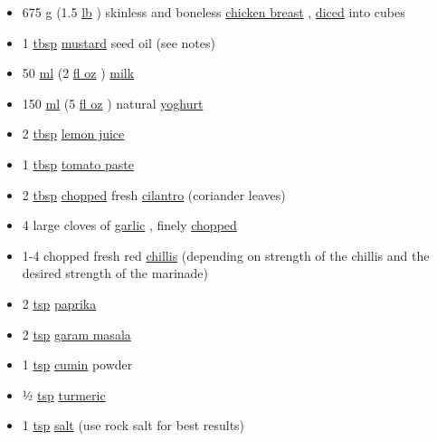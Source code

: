 \documentclass[11pt,a4paper]{article}
\begin{document}
\begin{itemize}
\item 675 \href{https://en.wikibooks.org/wiki/Cookbook:G}{g} (1.5 \href{https://en.wikibooks.org/wiki/Cookbook:Pound}{lb} ) skinless and boneless \href{https://en.wikibooks.org/wiki/Cookbook:Chicken\#Breast}{chicken breast} , \href{https://en.wikibooks.org/wiki/Cookbook:Dice}{diced} into cubes
\item 1 \href{https://en.wikibooks.org/wiki/Cookbook:Tablespoon}{tbsp} \href{https://en.wikibooks.org/wiki/Cookbook:Mustard}{mustard} seed oil (see notes)
\item 50 \href{https://en.wikibooks.org/wiki/Cookbook:ML}{ml} (2 \href{https://en.wikibooks.org/wiki/Cookbook:Fluid\_Ounce}{fl oz} ) \href{https://en.wikibooks.org/wiki/Cookbook:Milk}{milk}
\item 150 \href{https://en.wikibooks.org/wiki/Cookbook:ML}{ml} (5 \href{https://en.wikibooks.org/wiki/Cookbook:Fluid\_Ounce}{fl oz} ) natural \href{https://en.wikibooks.org/wiki/Cookbook:Yogurt}{yoghurt}
\item 2 \href{https://en.wikibooks.org/wiki/Cookbook:Tablespoon}{tbsp} \href{https://en.wikibooks.org/wiki/Cookbook:Lemon\_Juice}{lemon juice}
\item 1 \href{https://en.wikibooks.org/wiki/Cookbook:Tablespoon}{tbsp} \href{https://en.wikibooks.org/wiki/Cookbook:Tomato\_Paste}{tomato paste}
\item 2 \href{https://en.wikibooks.org/wiki/Cookbook:Tablespoon}{tbsp} \href{https://en.wikibooks.org/wiki/Cookbook:Chopping}{chopped} fresh \href{https://en.wikibooks.org/wiki/Cookbook:Cilantro}{cilantro} (coriander leaves)
\item 4 large cloves of \href{https://en.wikibooks.org/wiki/Cookbook:Garlic}{garlic} , finely \href{https://en.wikibooks.org/wiki/Cookbook:Chop}{chopped}
\item 1-4 chopped fresh red \href{https://en.wikibooks.org/wiki/Cookbook:Chili\_Pepper}{chillis} (depending on strength of the chillis and the desired strength of the marinade)
\item 2 \href{https://en.wikibooks.org/wiki/Cookbook:Teaspoon}{tsp} \href{https://en.wikibooks.org/wiki/Cookbook:Paprika}{paprika}
\item 2 \href{https://en.wikibooks.org/wiki/Cookbook:Teaspoon}{tsp} \href{https://en.wikibooks.org/wiki/Cookbook:Garam\_Masala}{garam masala}
\item 1 \href{https://en.wikibooks.org/wiki/Cookbook:Teaspoon}{tsp} \href{https://en.wikibooks.org/wiki/Cookbook:Cumin}{cumin} powder
\item ½ \href{https://en.wikibooks.org/wiki/Cookbook:Teaspoon}{tsp} \href{https://en.wikibooks.org/wiki/Cookbook:Turmeric}{turmeric}
\item 1 \href{https://en.wikibooks.org/wiki/Cookbook:Teaspoon}{tsp} \href{https://en.wikibooks.org/wiki/Cookbook:Salt}{salt} (use rock salt for best results)
\end{itemize}
\end{document}
